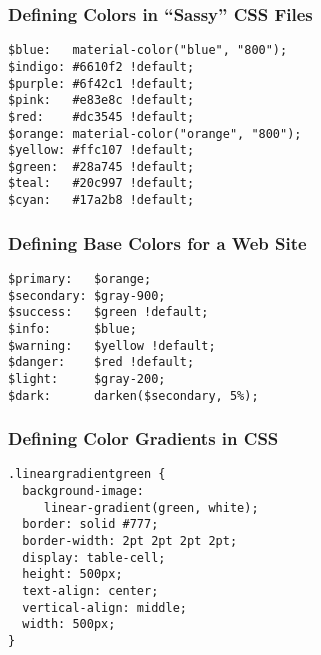 \documentclass[14pt,aspectratio=169]{beamer}
\begin{document}
%
\begin{frame}[fragile]
  \frametitle{Defining Colors in ``Sassy'' CSS Files}
  \normalsize
  \begin{minipage}{6in}
    \vspace*{.1in}
    \begin{verbatim}
$blue:   material-color("blue", "800");
$indigo: #6610f2 !default;
$purple: #6f42c1 !default;
$pink:   #e83e8c !default;
$red:    #dc3545 !default;
$orange: material-color("orange", "800");
$yellow: #ffc107 !default;
$green:  #28a745 !default;
$teal:   #20c997 !default;
$cyan:   #17a2b8 !default;
    \end{verbatim}
  \end{minipage}
\end{frame}

%
\begin{frame}[fragile]
  \frametitle{Defining Base Colors for a Web Site}
  \normalsize
  \begin{minipage}{6in}
    \vspace*{.1in}
    \begin{verbatim}
$primary:   $orange;
$secondary: $gray-900;
$success:   $green !default;
$info:      $blue;
$warning:   $yellow !default;
$danger:    $red !default;
$light:     $gray-200;
$dark:      darken($secondary, 5%);
    \end{verbatim}
  \end{minipage}
\end{frame}

%
\begin{frame}[fragile]
  \frametitle{Defining Color Gradients in CSS}
  \normalsize
  \begin{minipage}{6in}
    \vspace*{.1in}
    \begin{verbatim}
.lineargradientgreen {
  background-image:
     linear-gradient(green, white);
  border: solid #777;
  border-width: 2pt 2pt 2pt 2pt;
  display: table-cell;
  height: 500px;
  text-align: center;
  vertical-align: middle;
  width: 500px;
}
    \end{verbatim}
  \end{minipage}
\end{frame}
\end{document}
